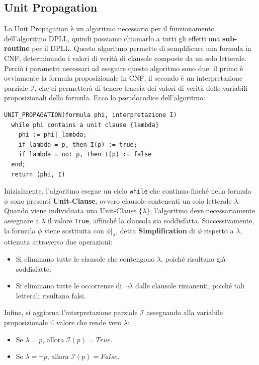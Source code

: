 \subsection{Unit Propagation} \label{unit}
Lo Unit Propagation è un algoritmo necessario per il funzionamento dell'algoritmo DPLL, quindi possiamo chiamarlo a tutti gli effetti una \textbf{sub-routine} per il DPLL.
Questo algoritmo permette di semplificare una formula in CNF, determinando i valori di verità di clausole composte da un solo letterale. Perciò i parametri necessari ad eseguire questo algoritmo 
sono due: il primo è ovviamente la formula proposizionale in CNF, il secondo è un interpretazione parziale $\mathcal{I}$, che ci permetterà di tenere traccia dei valori di verità delle variabili proposizionali della formula.
Ecco lo pseudocodice dell'algoritmo:\smallskip\\
\begin{center}
\begin{minipage}{0.65\textwidth}
\begin{verbatim}
UNIT_PROPAGATION(formula phi, interpretazione I)
  while phi contains a unit clause {lambda}
    phi := phi|_lambda;
    if lambda = p, then I(p) := true;
    if lambda = not p, then I(p) := false
  end;
  return (phi, I)
\end{verbatim}
\end{minipage}
\end{center}
Inizialmente, l'algoritmo esegue un ciclo \texttt{while} che
continua finché nella formula $\phi$ sono presenti
\textbf{Unit-Clause}, ovvero clausole contenenti
un solo letterale $\lambda$. Quando viene individuata una Unit-Clause $\{\lambda\}$,
l'algoritmo deve necessariamente assegnare a $\lambda$
il valore \texttt{True}, affinché la clausola sia soddisfatta.
Successivamente, la formula $\phi$ viene sostituita con
$\phi|_{\lambda}$, detta \textbf{Simplification} di
$\phi$ rispetto a $\lambda$, ottenuta attraverso
due operazioni:
\begin{itemize}
    \item Si eliminano tutte le clausole che contengono
    $\lambda$, poiché risultano già soddisfatte.

    \item Si eliminano tutte le occorrenze di
    $\neg\lambda$ dalle clausole rimanenti, poiché
    tali letterali risultano falsi.
\end{itemize}
Infine, si aggiorna l'interpretazione parziale
$\mathcal{I}$ assegnando alla variabile proposizionale
il valore che rende vero $\lambda$:
\begin{itemize}
    \item Se $\lambda=p$, allora $\mathcal{I}(p)=True$.
    \item Se $\lambda=\neg p$, allora $\mathcal{I}(p)=False$.
\end{itemize}
